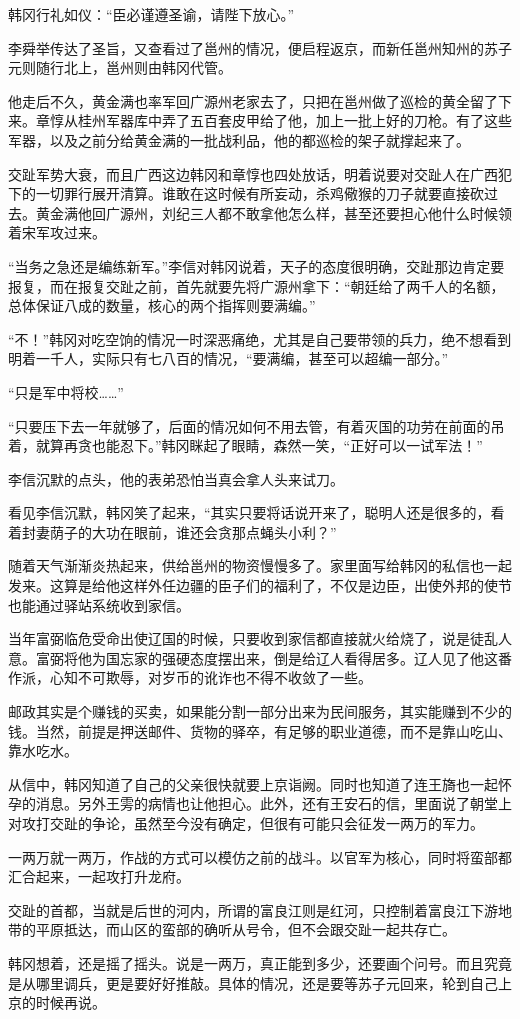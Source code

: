 韩冈行礼如仪：“臣必谨遵圣谕，请陛下放心。”

李舜举传达了圣旨，又查看过了邕州的情况，便启程返京，而新任邕州知州的苏子元则随行北上，邕州则由韩冈代管。

他走后不久，黄金满也率军回广源州老家去了，只把在邕州做了巡检的黄全留了下来。章惇从桂州军器库中弄了五百套皮甲给了他，加上一批上好的刀枪。有了这些军器，以及之前分给黄金满的一批战利品，他的都巡检的架子就撑起来了。

交趾军势大衰，而且广西这边韩冈和章惇也四处放话，明着说要对交趾人在广西犯下的一切罪行展开清算。谁敢在这时候有所妄动，杀鸡儆猴的刀子就要直接砍过去。黄金满他回广源州，刘纪三人都不敢拿他怎么样，甚至还要担心他什么时候领着宋军攻过来。

“当务之急还是编练新军。”李信对韩冈说着，天子的态度很明确，交趾那边肯定要报复，而在报复交趾之前，首先就要先将广源州拿下：“朝廷给了两千人的名额，总体保证八成的数量，核心的两个指挥则要满编。”

“不！”韩冈对吃空饷的情况一时深恶痛绝，尤其是自己要带领的兵力，绝不想看到明着一千人，实际只有七八百的情况，“要满编，甚至可以超编一部分。”

“只是军中将校……”

“只要压下去一年就够了，后面的情况如何不用去管，有着灭国的功劳在前面的吊着，就算再贪也能忍下。”韩冈眯起了眼睛，森然一笑，“正好可以一试军法！”

李信沉默的点头，他的表弟恐怕当真会拿人头来试刀。

看见李信沉默，韩冈笑了起来，“其实只要将话说开来了，聪明人还是很多的，看着封妻荫子的大功在眼前，谁还会贪那点蝇头小利？”

随着天气渐渐炎热起来，供给邕州的物资慢慢多了。家里面写给韩冈的私信也一起发来。这算是给他这样外任边疆的臣子们的福利了，不仅是边臣，出使外邦的使节也能通过驿站系统收到家信。

当年富弼临危受命出使辽国的时候，只要收到家信都直接就火给烧了，说是徒乱人意。富弼将他为国忘家的强硬态度摆出来，倒是给辽人看得居多。辽人见了他这番作派，心知不可欺辱，对岁币的讹诈也不得不收敛了一些。

邮政其实是个赚钱的买卖，如果能分割一部分出来为民间服务，其实能赚到不少的钱。当然，前提是押送邮件、货物的驿卒，有足够的职业道德，而不是靠山吃山、靠水吃水。

从信中，韩冈知道了自己的父亲很快就要上京诣阙。同时也知道了连王旖也一起怀孕的消息。另外王雱的病情也让他担心。此外，还有王安石的信，里面说了朝堂上对攻打交趾的争论，虽然至今没有确定，但很有可能只会征发一两万的军力。

一两万就一两万，作战的方式可以模仿之前的战斗。以官军为核心，同时将蛮部都汇合起来，一起攻打升龙府。

交趾的首都，当就是后世的河内，所谓的富良江则是红河，只控制着富良江下游地带的平原抵达，而山区的蛮部的确听从号令，但不会跟交趾一起共存亡。

韩冈想着，还是摇了摇头。说是一两万，真正能到多少，还要画个问号。而且究竟是从哪里调兵，更是要好好推敲。具体的情况，还是要等苏子元回来，轮到自己上京的时候再说。

